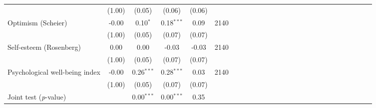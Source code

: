 {\begin{tabular}{l*{5}{SSSSc}}
          &   (1.00)&   (0.05)&   (0.06)&   (0.06)&         \\
Optimism (Scheier)&    -0.00&0.10$^{*}$&0.18$^{***}$&     0.09&     2140\\
          &   (1.00)&   (0.05)&   (0.07)&   (0.07)&         \\
Self-esteem (Rosenberg)&     0.00&     0.00&    -0.03&    -0.03&     2140\\
          &   (1.00)&   (0.05)&   (0.07)&   (0.07)&         \\
Psychological well-being index&    -0.00&0.26$^{***}$&0.28$^{***}$&     0.03&     2140\\
          &   (1.00)&   (0.05)&   (0.07)&   (0.07)&         \\
\midrule Joint test (\emph{p}-value)&         &{0.00$^{***}$}&{0.00$^{***}$}&   {0.35}&         \\
\bottomrule
\end{tabular}
}
